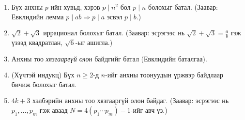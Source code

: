 \begin{enumerate}
  \item Бүх анхны $p$-ийн хувьд, хэрэв $p\mid n^2$ бол $p\mid n$ болохыг батал.
        (Заавар: Евклидийн лемма $p\mid ab \Rightarrow p\mid a$ эсвэл $p\mid b$.)
  \item $\sqrt{2}+\sqrt{3}$ иррационал болохыг батал.
        (Заавар: эсрэгээс нь $\sqrt{2}+\sqrt{3}=\tfrac{a}{b}$ гэж үзээд квадратлан, $\sqrt{6}$-ыг ашигла.)
  \item Анхны тоо \emph{хязгааргүй олон} байдгийг батал (Евклидийн баталгаа).
  \item (Хүчтэй индукц) Бүх $n\ge 2$-д $n$-ийг анхны тоонуудын үржвэр байдлаар бичиж болохыг батал.
  \item $4k+3$ хэлбэрийн анхны тоо хязгааргүй олон байдаг.
        (Заавар: эсрэгээс нь $p_1,\dots,p_m$ гэж аваад $N=4(p_1\cdots p_m)-1$-ийг авч үз.)
\end{enumerate}
\newpage
